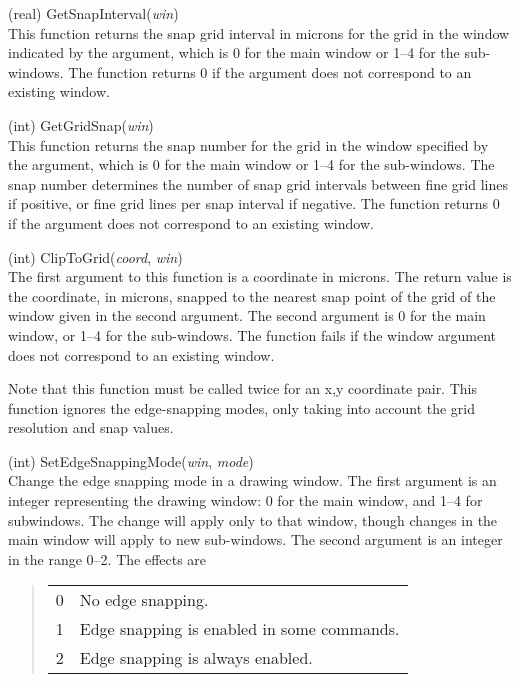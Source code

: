 \begin{description}
\item{(real) \vt GetSnapInterval({\it win\/})}\\
This function returns the snap grid interval in microns for the grid
in the window indicated by the argument, which is 0 for the main
window or 1--4 for the sub-windows.  The function returns 0 if the
argument does not correspond to an existing window.

\item{(int) \vt GetGridSnap({\it win\/})}\\
This function returns the snap number for the grid in the window
specified by the argument, which is 0 for the main window or 1--4 for
the sub-windows.  The snap number determines the number of snap grid
intervals between fine grid lines if positive, or fine grid lines per
snap interval if negative.  The function returns 0 if the argument
does not correspond to an existing window.

\item{(int) \vt ClipToGrid({\it coord}, {\it win\/})}\\
The first argument to this function is a coordinate in microns.  The
return value is the coordinate, in microns, snapped to the nearest
snap point of the grid of the window given in the second argument. 
The second argument is 0 for the main window, or 1--4 for the
sub-windows.  The function fails if the window argument does not
correspond to an existing window.

Note that this function must be called twice for an x,y coordinate
pair.  This function ignores the edge-snapping modes, only taking into
account the grid resolution and snap values.

\item{(int) \vt SetEdgeSnappingMode({\it win}, {\it mode\/})}\\
Change the edge snapping mode in a drawing window.  The first argument
is an integer representing the drawing window:  0 for the main window,
and 1--4 for subwindows.  The change will apply only to that window,
though changes in the main window will apply to new sub-windows.  The
second argument is an integer in the range 0--2.  The effects are

\begin{quote}
\begin{tabular}{ll}
0 & No edge snapping.\\
1 & Edge snapping is enabled in some commands.\\
2 & Edge snapping is always enabled.\\
\end{tabular}
\end{quote}
 

\end{description}
